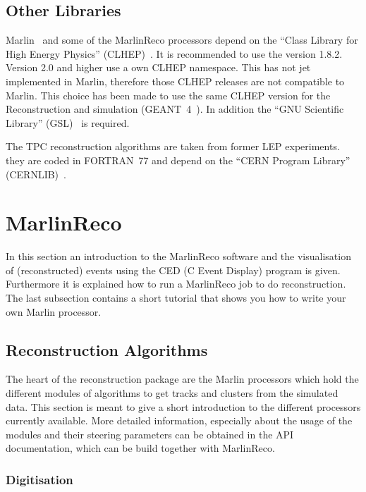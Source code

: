 \subsection{Other Libraries}

Marlin~\cite{ref_marlin} and some of the MarlinReco processors depend on the
``Class Library for High Energy Physics'' (CLHEP)~\cite{ref_clhep}. 
It is recommended to use the version 1.8.2. Version 2.0 and higher use a 
own CLHEP namespace. This has not jet implemented in Marlin, therefore those
CLHEP releases are not compatible to Marlin. This choice has been 
made to use the same CLHEP version for the Reconstruction and simulation 
(GEANT~4~\cite{ref_geant4}). In addition the ``GNU Scientific Library'' 
(GSL)~\cite{ref_gsl} is required. 

The TPC reconstruction algorithms are taken from former LEP experiments.  
they are coded in FORTRAN~77 and depend on the ``CERN Program Library'' 
(CERNLIB)~\cite{ref_cernlib}. 

\section{MarlinReco}

In this section an introduction to the MarlinReco software and the
visualisation of (reconstructed) events using the 
CED (C Event Display) program is given. Furthermore it is explained how to 
run a MarlinReco job to do reconstruction. The last subsection 
contains a short tutorial that shows you how to write your own Marlin 
processor. 

\subsection{Reconstruction Algorithms}

The heart of the reconstruction package are the Marlin processors
which hold the different modules of algorithms to get tracks and 
clusters from the simulated data. This section is meant to give a short 
introduction to the different processors currently available. More detailed 
information, especially about the usage of the modules and their 
steering parameters can be obtained in the API documentation, which can be
build together with MarlinReco. 

\subsubsection{Digitisation}

